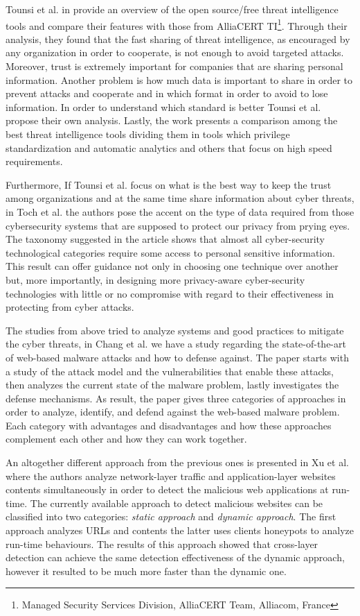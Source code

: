 Tounsi et al. in \cite{TounsiR18} provide an overview of the open source/free threat intelligence tools and compare their features with those from AlliaCERT TI\footnote{Managed Security Services Division, AlliaCERT Team, Alliacom, France}. Through their analysis, they found that the fast sharing of threat intelligence, as encouraged by any organization in order to cooperate, is not enough to avoid targeted attacks. Moreover, trust is extremely important for companies that are sharing personal information. Another problem is how much data is important to share in order to prevent attacks and cooperate and in which format in order to avoid to lose information. In order to understand which standard is better Tounsi et al. propose their own analysis. Lastly, the work presents a comparison among the best threat intelligence tools dividing them in tools which privilege standardization and automatic analytics and others that focus on high speed requirements. 

Furthermore, If Tounsi et al. focus on what is the best way to keep the trust among organizations and at the same time share information about cyber threats, in Toch et al. \cite{Toch:2018:PIC:3186333.3172869} the authors pose the accent on the type of data required from those cybersecurity systems that are supposed to protect our privacy from prying eyes. The taxonomy suggested in the article shows that almost all cyber-security technological categories require some access to personal sensitive information. This result can offer guidance not only in choosing one technique over another but, more importantly, in designing more privacy-aware cyber-security technologies with little or no compromise with regard to their effectiveness in protecting from cyber attacks. 

The studies from above tried to analyze systems and good practices to mitigate the cyber threats, in Chang et al. \cite{ChangVWL13} we have a study regarding the state-of-the-art of web-based malware attacks and how to defense against. The paper starts with a study of the attack model and the vulnerabilities that enable these attacks, then analyzes the current state of the malware problem, lastly investigates the defense mechanisms. As result, the paper gives three categories of approaches in order to analyze, identify, and defend against the web-based malware problem. Each category with advantages and disadvantages and how these approaches complement each other and how they can work together. 

An altogether different approach from the previous ones is presented in Xu et al. \cite{Xu:2013:CDM:2435349.2435366} where the authors analyze network-layer traffic and application-layer websites contents simultaneously in order to detect the malicious web applications at run-time. The currently available approach to detect malicious websites can be classified into two categories: \textit{static approach} and \textit{dynamic approach}. The first approach analyzes URLs and contents the latter uses clients honeypots to analyze run-time behaviours. The results of this approach showed that cross-layer detection can achieve the same detection effectiveness of the dynamic approach, however it resulted to be much more faster than the dynamic one. 

